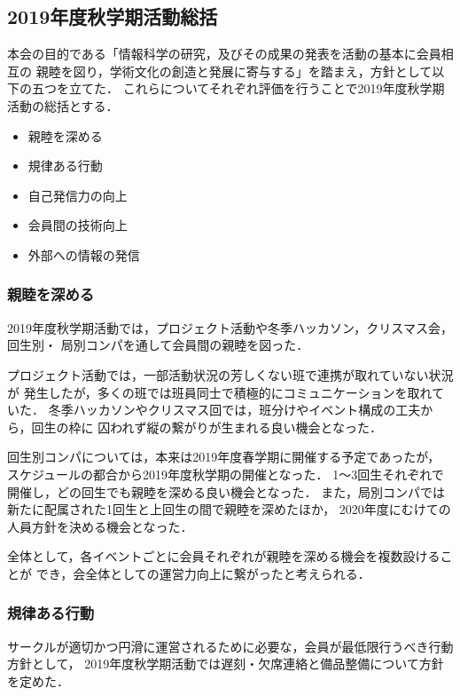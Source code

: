 \subsection*{2019年度秋学期活動総括}


本会の目的である「情報科学の研究，及びその成果の発表を活動の基本に会員相互の
親睦を図り，学術文化の創造と発展に寄与する」を踏まえ，方針として以下の五つを立てた．
これらについてそれぞれ評価を行うことで2019年度秋学期活動の総括とする．

\begin{itemize}
    \item 親睦を深める
    \item 規律ある行動
    \item 自己発信力の向上
    \item 会員間の技術向上
    \item 外部への情報の発信
\end{itemize}

\subsubsection*{親睦を深める}
2019年度秋学期活動では，プロジェクト活動や冬季ハッカソン，クリスマス会，回生別・
局別コンパを通して会員間の親睦を図った．

プロジェクト活動では，一部活動状況の芳しくない班で連携が取れていない状況が
発生したが，多くの班では班員同士で積極的にコミュニケーションを取れていた．
冬季ハッカソンやクリスマス回では，班分けやイベント構成の工夫から，回生の枠に
囚われず縦の繋がりが生まれる良い機会となった．

回生別コンパについては，本来は2019年度春学期に開催する予定であったが，
スケジュールの都合から2019年度秋学期の開催となった．
1〜3回生それぞれで開催し，どの回生でも親睦を深める良い機会となった．
また，局別コンパでは新たに配属された1回生と上回生の間で親睦を深めたほか，
2020年度にむけての人員方針を決める機会となった．

全体として，各イベントごとに会員それぞれが親睦を深める機会を複数設けることが
でき，会全体としての運営力向上に繋がったと考えられる．

\subsubsection*{規律ある行動}
サークルが適切かつ円滑に運営されるために必要な，会員が最低限行うべき行動方針として，
2019年度秋学期活動では遅刻・欠席連絡と備品整備について方針を定めた．

